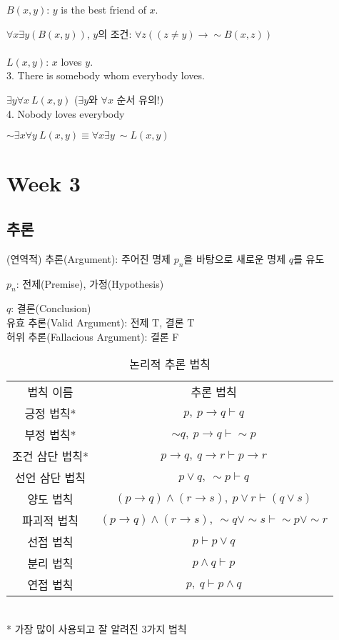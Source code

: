 $B(x, y)$: $y$ is the best friend of $x$.

$\forall x \exists y (B(x, y))$, $y$의 조건: $\forall z((z\neq y) \to \sim B(x, z))$\\\\
$L(x, y)$: $x$ loves $y$.\\
3. There is somebody whom everybody loves.

$\exists y\forall x\ L(x, y)$ ($\exists y$와 $\forall x$ 순서 유의!)\\
4. Nobody loves everybody

$\sim \exists x \forall y\ L(x, y) \equiv \forall x \exists y\ \sim L(x, y)$
\section{Week 3}
\subsection{추론}
(연역적) 추론(Argument): 주어진 명제 $p_n$을 바탕으로 새로운 명제 $q$를 유도

$p_n$: 전제(Premise), 가정(Hypothesis)

$q$: 결론(Conclusion)\\
유효 추론(Valid Argument): 전제 T, 결론 T\\
허위 추론(Fallacious Argument): 결론 F
\begin{table}[H]
    \caption {논리적 추론 법칙}
    \centering
    \begin{tabular}{c|c}
        법칙 이름&추론 법칙\\
        \Xhline{3\arrayrulewidth}
        긍정 법칙*&$p,\ p\to q\vdash q$\\
        \hline
        부정 법칙*&$\sim q,\ p \to q\vdash \sim p$\\
        \hline
        조건 삼단 법칙*&$p \to q,\ q \to r\vdash p \to r$\\
        \hline
        선언 삼단 법칙&$p \lor q,\ \sim p\vdash q$\\
        \hline
        양도 법칙&$(p\to q)\land(r\to s),\ p\lor r\vdash (q\lor s)$\\
        \hline
        파괴적 법칙&$(p\to q)\land(r\to s),\ \sim q \lor \sim s\vdash \sim p \lor \sim r$\\
        \hline
        선접 법칙&$p \vdash p \lor q$\\
        \hline
        분리 법칙&$p \land q\vdash p$\\
        \hline
        연접 법칙&$p,\ q\vdash p \land q$
    \end{tabular}
    \\
    \bigskip
    * 가장 많이 사용되고 잘 알려진 3가지 법칙
\end{table}
